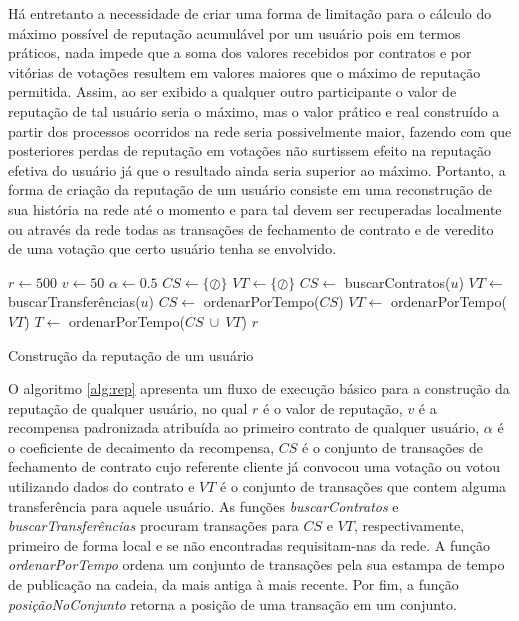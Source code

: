 Há entretanto a necessidade de criar uma forma de limitação para o cálculo do máximo possível de reputação acumulável por um usuário pois em termos práticos, nada impede que a soma dos valores recebidos por contratos e por vitórias de votações resultem em valores maiores que o máximo de reputação permitida. Assim, ao ser exibido a qualquer outro participante o valor de reputação de tal usuário seria o máximo, mas o valor prático e real construído a partir dos processos ocorridos na rede seria possivelmente maior, fazendo com que posteriores perdas de reputação em votações não surtissem efeito na reputação efetiva do usuário já que o resultado ainda seria superior ao máximo. Portanto, a forma de criação da reputação de um usuário consiste em uma reconstrução de sua história na rede até o momento e para tal devem ser recuperadas localmente ou através da rede todas as transações de fechamento de contrato e de veredito de uma votação que certo usuário tenha se envolvido.

\begin{algorithm}[h]
 $r \gets 500$\;
 $v \gets 50$\;
 $\alpha \gets 0.5$\;
 $CS \gets \{\oslash\}$\;
 $VT \gets \{\oslash\}$\;
 $CS \gets$ buscarContratos($u$)\;
 $VT \gets$ buscarTransferências($u$)\;
 $CS \gets$ ordenarPorTempo($CS$)\;
 $VT \gets$ ordenarPorTempo($VT$)\;
 $T \gets$ ordenarPorTempo($CS\ \cup\ VT$)\;
 \Retorna $r$
 \caption{Construção da reputação de um usuário}
 \label{alg:rep}
\end{algorithm}

O algoritmo \ref{alg:rep} apresenta um fluxo de execução básico para a construção da reputação de qualquer usuário, no qual $r$ é o valor de reputação, $v$ é a recompensa padronizada atribuída ao primeiro contrato de qualquer usuário, $\alpha$ é o coeficiente de decaimento da recompensa, $CS$ é o conjunto de transações de fechamento de contrato cujo referente cliente já convocou uma votação ou votou utilizando dados do contrato e $VT$ é o conjunto de transações que contem alguma transferência para aquele usuário. As funções \textit{buscarContratos} e \textit{buscarTransferências} procuram transações para $CS$ e $VT$, respectivamente, primeiro de forma local e se não encontradas requisitam-nas da rede. A função \textit{ordenarPorTempo} ordena um conjunto de transações pela sua estampa de tempo de publicação na cadeia, da mais antiga à mais recente. Por fim, a função \textit{posiçãoNoConjunto} retorna a posição de uma transação em um conjunto.

